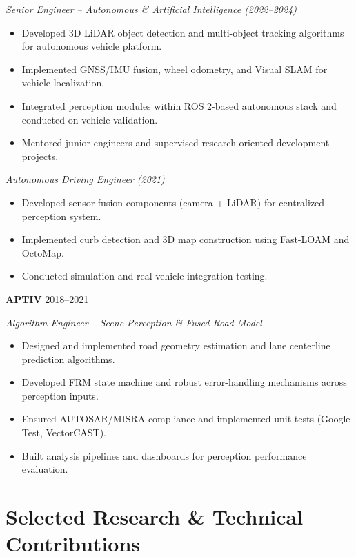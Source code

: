 \documentclass[11pt]{article}
\begin{document}
\textit{Senior Engineer – Autonomous \& Artificial Intelligence (2022--2024)}
\begin{itemize}[leftmargin=*]
\item Developed 3D LiDAR object detection and multi-object tracking algorithms for autonomous vehicle platform.
\item Implemented GNSS/IMU fusion, wheel odometry, and Visual SLAM for vehicle localization.
\item Integrated perception modules within ROS 2-based autonomous stack and conducted on-vehicle validation.
\item Mentored junior engineers and supervised research-oriented development projects.
\end{itemize}

\textit{Autonomous Driving Engineer (2021)}
\begin{itemize}[leftmargin=*]
\item Developed sensor fusion components (camera + LiDAR) for centralized perception system.
\item Implemented curb detection and 3D map construction using Fast-LOAM and OctoMap.
\item Conducted simulation and real-vehicle integration testing.
\end{itemize}

\vspace{6pt}

\textbf{APTIV} \hfill 2018--2021

\textit{Algorithm Engineer – Scene Perception \& Fused Road Model}
\begin{itemize}[leftmargin=*]
\item Designed and implemented road geometry estimation and lane centerline prediction algorithms.
\item Developed FRM state machine and robust error-handling mechanisms across perception inputs.
\item Ensured AUTOSAR/MISRA compliance and implemented unit tests (Google Test, VectorCAST).
\item Built analysis pipelines and dashboards for perception performance evaluation.
\end{itemize}

\section*{Selected Research \& Technical Contributions}
\end{document}
